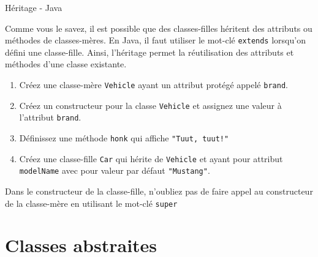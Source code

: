 	
\begin{Exercice}[10 minutes]{Héritage - Java}

	Comme vous le savez, il est possible que des classes-filles héritent des attributs ou méthodes de classes-mères.
	En Java, il faut utiliser le mot-clé \lstinline{extends} lorsqu'on défini une classe-fille. Ainsi, l'héritage permet la réutilisation des attributs et méthodes d'une classe existante.

	\begin{enumerate}
		\item Créez une classe-mère \lstinline{Vehicle} ayant un attribut protégé appelé \lstinline{brand}.
		\item Créez un constructeur pour la classe \lstinline{Vehicle} et assignez une valeur à l'attribut \lstinline{brand}.
		\item Définissez une méthode \lstinline{honk} qui affiche \lstinline{"Tuut, tuut!"}
		\item Créez une classe-fille \lstinline{Car} qui hérite de \lstinline{Vehicle} et ayant pour attribut \lstinline{modelName} avec pour valeur par défaut \lstinline{"Mustang"}.
	\end{enumerate}

	\begin{conseil}
		Dans le constructeur de la classe-fille, n'oubliez pas de faire appel au constructeur de la classe-mère en utilisant le mot-clé \lstinline{super}
	\end{conseil}	
	
	\begin{solution}
		 
	\end{solution}
\end{Exercice}
	

\section{Classes abstraites}

